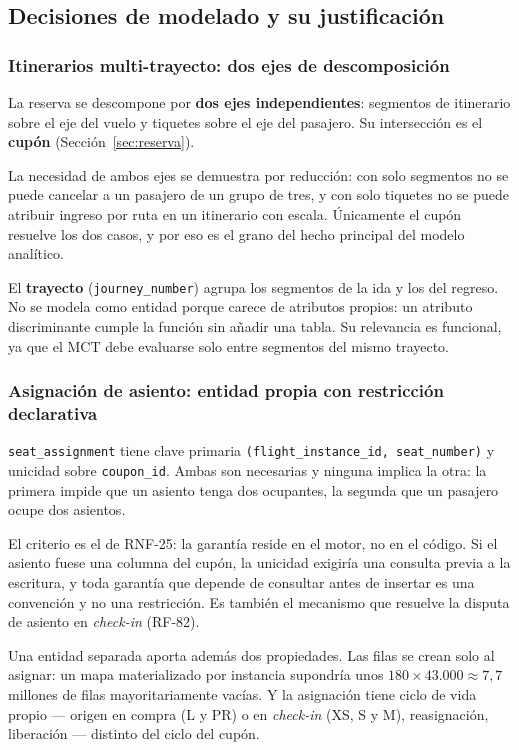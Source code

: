 \documentclass[10pt,letterpaper]{article}
\begin{document}
\subsection{Decisiones de modelado y su justificación}

\subsubsection{Itinerarios multi-trayecto: dos ejes de descomposición}
La reserva se descompone por \textbf{dos ejes independientes}: segmentos de itinerario sobre el eje del vuelo y tiquetes sobre el eje del pasajero. Su intersección es el \textbf{cupón} (Sección~\ref{sec:reserva}).

La necesidad de ambos ejes se demuestra por reducción: con solo segmentos no se puede cancelar a un pasajero de un grupo de tres, y con solo tiquetes no se puede atribuir ingreso por ruta en un itinerario con escala. Únicamente el cupón resuelve los dos casos, y por eso es el grano del hecho principal del modelo analítico.

El \textbf{trayecto} (\texttt{journey\_number}) agrupa los segmentos de la ida y los del regreso. No se modela como entidad porque carece de atributos propios: un atributo discriminante cumple la función sin añadir una tabla. Su relevancia es funcional, ya que el MCT debe evaluarse solo entre segmentos del mismo trayecto.

\subsubsection{Asignación de asiento: entidad propia con restricción declarativa}
\texttt{seat\_assignment} tiene clave primaria \texttt{(flight\_instance\_id, seat\_number)} y unicidad sobre \texttt{coupon\_id}. Ambas son necesarias y ninguna implica la otra: la primera impide que un asiento tenga dos ocupantes, la segunda que un pasajero ocupe dos asientos.

El criterio es el de RNF-25: la garantía reside en el motor, no en el código. Si el asiento fuese una columna del cupón, la unicidad exigiría una consulta previa a la escritura, y toda garantía que depende de consultar antes de insertar es una convención y no una restricción. Es también el mecanismo que resuelve la disputa de asiento en \emph{check-in} (RF-82).

Una entidad separada aporta además dos propiedades. Las filas se crean solo al asignar: un mapa materializado por instancia supondría unos $180 \times 43.000 \approx 7{,}7$ millones de filas mayoritariamente vacías. Y la asignación tiene ciclo de vida propio --- origen en compra (L y PR) o en \emph{check-in} (XS, S y M), reasignación, liberación --- distinto del ciclo del cupón.
\end{document}

